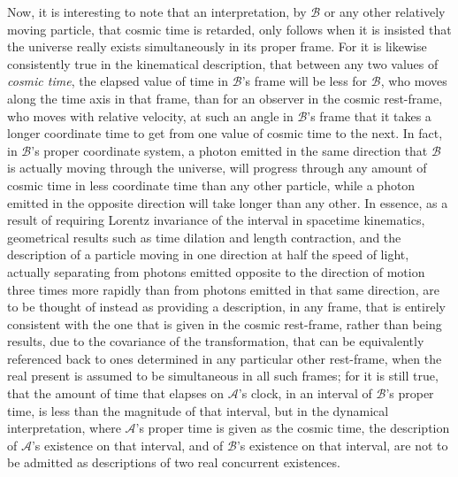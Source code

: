 Now, it is interesting to note that an interpretation, by $\mathcal{B}$ or any other relatively moving particle, that cosmic time is retarded, only follows when it is insisted that the universe really exists simultaneously in its proper frame. For it is likewise consistently true in the kinematical description, that between any two values of \textit{cosmic time}, the elapsed value of time in $\mathcal{B}$'s frame will be less for $\mathcal{B}$, who moves along the time axis in that frame, than for an observer in the cosmic rest-frame, who moves with relative velocity, at such an angle in $\mathcal{B}$'s frame that it takes a longer coordinate time to get from one value of cosmic time to the next. In fact, in $\mathcal{B}$'s proper coordinate system, a photon emitted in the same direction that $\mathcal{B}$ is actually moving through the universe, will progress through any amount of cosmic time in less coordinate time than any other particle, while a photon emitted in the opposite direction will take longer than any other. In essence, as a result of requiring Lorentz invariance of the interval in spacetime kinematics, geometrical results such as time dilation and length contraction, and the description of a particle moving in one direction at half the speed of light, actually separating from photons emitted opposite to the direction of motion three times more rapidly than from photons emitted in that same direction, are to be thought of instead as providing a description, in any frame, that is entirely consistent with the one that is given in the cosmic rest-frame, rather than being results, due to the covariance of the transformation, that can be equivalently referenced back to ones determined in any particular other rest-frame, when the real present is assumed to be simultaneous in all such frames; for it is still true, that the amount of time that elapses on $\mathcal{A}$'s clock, in an interval of $\mathcal{B}$'s proper time, is less than the magnitude of that interval, but in the dynamical interpretation, where $\mathcal{A}$'s proper time is given as the cosmic time, the description of $\mathcal{A}$'s existence on that interval, and of $\mathcal{B}$'s existence on that interval, are not to be admitted as descriptions of two real concurrent existences.

